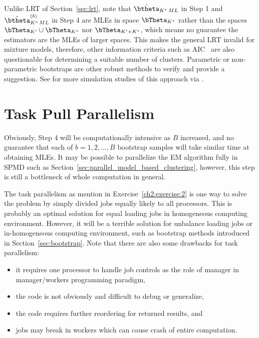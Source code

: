 Unlike LRT of Section~\ref{sec:lrt}, note that
$\hat{\btheta}_{K^*\,ML}$ in Step 1 and
$\hat{\btheta}^{(b)}_{K^*\,ML}$ in Step 4
are MLEs in space $\bTheta_{K^*}$ rather than the spaces
$\bTheta_{K^\prime} \cup \bTheta_{K^*}$ nor $\bTheta_{K^\prime + K^*}$,
which means no guarantee the estimators are the MLEs of larger spaces.
This makes the general LRT invalid for mixture models, therefore, other
information criteria such as AIC~\citep{aic} are also questionable
for determining a suitable number of clusters.
Parametric or non-parametric bootstraps are other robust methods 
to verify and provide a suggestion.
See \citet{Chen2011a} for more simulation studies of this approach via
.




\section{Task Pull Parallelism}
\label{sec:task_pull}

Obviously, Step 4 will be computationally intensive as $B$ increased,
and no guarantee that each of $b = 1,2,\ldots, B$ bootstrap samples
will take similar time at obtaining MLEs. It may be possible to parallelize
the EM algorithm fully in SPMD such as
Section~\ref{sec:parallel_model_based_clustering},
however, this step is still a bottleneck of whole computation in general.

The task parallelism
as mention in Exercise~\ref{ch2:exercise:2}
is one way to solve the problem by simply divided jobs equally likely
to all processors.
This is probably an optimal solution for equal loading jobs
in homogeneous computing environment. However, it
will be a terrible solution for unbalance loading jobs or in-homogeneous
computing environment, such as
bootstrap methods introduced in Section~\ref{sec:bootstrap}.
Note that there are also some drawbacks for task parallelism:
\begin{itemize}
\item
it requires one processor to handle job controls as the role of manager in
manager/workers programming paradigm,
\item
the code is not obviously and difficult to debug or generalize,
\item
the code requires further reordering for returned results, and
\item
jobs may break in workers which can cause crash of entire computation.
\end{itemize}

